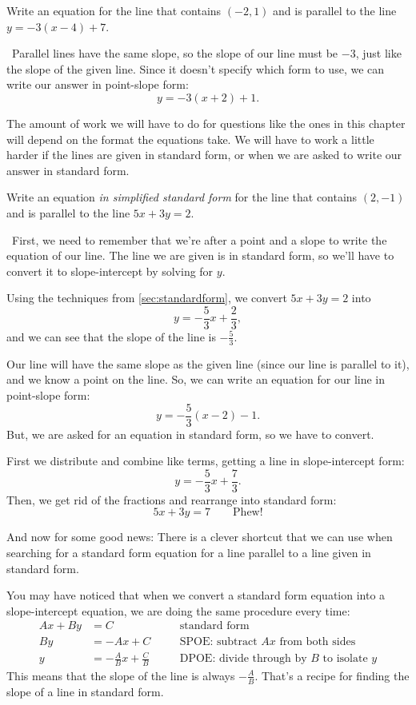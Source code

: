 \begin{boxex}
Write an equation for the line that contains $(-2,1)$ and is parallel to the line $y=-3(x-4)+7$.

\exsoln\ Parallel lines have the same slope, so the slope of our line must be $-3$, just like the slope of the given line. Since it doesn't specify which form to use, we can write our answer in point-slope form: \[y=-3(x+2)+1.\]
\end{boxex}

The amount of work we will have to do for questions like the ones in this chapter will depend on the format the equations take. We will have to work a little harder if the lines are given in standard form, or when we are asked to write our answer in standard form.

\begin{boxex}
Write an equation \textit{in simplified standard form} for the line that contains $(2,-1)$ and is parallel to the line $5x+3y=2$.

\exsoln\ First, we need to remember that we're after a point and a slope to write the equation of our line. The line we are given is in standard form, so we'll have to convert it to slope-intercept by solving for $y$.

Using the techniques from \cref{sec:standardform}, we convert $5x + 3y = 2$ into \[y = -\frac{5}{3}x + \frac{2}{3},\] and we can see that the slope of the line is $-\frac{5}{3}$.

Our line will have the same slope as the given line (since our line is parallel to it), and we know a point on the line. So, we can write an equation for our line in point-slope form: \[y=-\frac{5}{3}(x-2)-1.\] But, we are asked for an equation in standard form, so we have to convert.

First we distribute and combine like terms, getting a line in slope-intercept form:\[y=-\frac{5}{3}x+\frac{7}{3}.\] Then, we get rid of the fractions and rearrange into standard form: \[5x + 3y = 7 \qquad\text{Phew!}\]
\end{boxex}

And now for some good news: There is a clever shortcut that we can use when searching for a standard form equation for a line parallel to a line given in standard form. 

You may have noticed that when we convert a standard form equation into a slope-intercept equation, we are doing the same procedure every time:
\[\begin{aligned}
Ax + By &= C
&& \quad\text{standard form}
\\
By &= -Ax + C
&& \quad\text{SPOE: subtract $Ax$ from both sides}
\\
y &= -\frac{A}{B}x + \frac{C}{B}
&& \quad\text{DPOE: divide through by $B$ to isolate $y$}
\end{aligned}\]
This means that the slope of the line is always $-\frac{A}{B}$. That's a recipe for finding the slope of a line in standard form.

